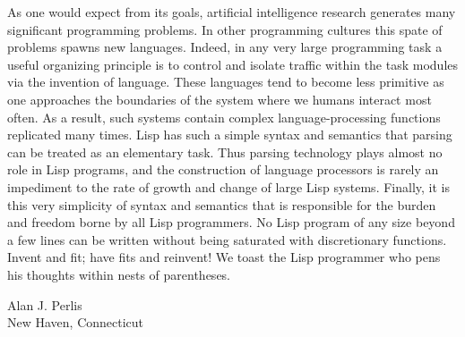 As one would expect from its goals, artificial intelligence research generates many significant programming problems.
In other programming cultures this spate of problems spawns new languages.
Indeed, in any very large programming task a useful organizing principle is to control and isolate traffic within the task modules via the invention of language.
These languages tend to become less primitive as one approaches the boundaries of the system where we humans interact most often.
As a result, such systems contain complex language-processing functions replicated many times.
Lisp has such a simple syntax and semantics that parsing can be treated as an elementary task.
Thus parsing technology plays almost no role in Lisp programs, and the construction of language processors is rarely an impediment to the rate of growth and change of large Lisp systems.
Finally, it is this very simplicity of syntax and semantics that is responsible for the burden and freedom borne by all Lisp programmers.
No Lisp program of any size beyond a few lines can be written without being saturated with discretionary functions.
Invent and fit;
have fits and reinvent!
We toast the Lisp programmer who pens his thoughts within nests of parentheses.

\vspace{0.5em}
\noindent
Alan J. Perlis\\
New Haven, Connecticut
